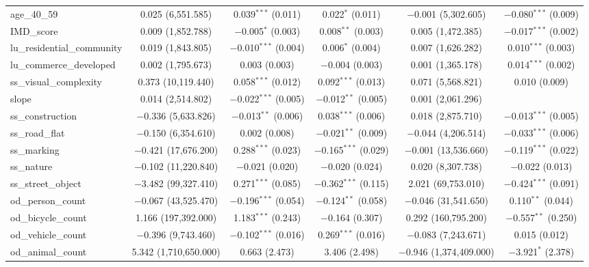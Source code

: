 \begin{table}[!htbp]
\begin{tabular}{@{\extracolsep{1pt}}lccccc}
  age\_40\_59 & 0.025 (6,551.585) & 0.039$^{***}$ (0.011) & 0.022$^{*}$ (0.011) & $-$0.001 (5,302.605) & $-$0.080$^{***}$ (0.009) \\ 
  IMD\_score & 0.009 (1,852.788) & $-$0.005$^{*}$ (0.003) & 0.008$^{**}$ (0.003) & 0.005 (1,472.385) & $-$0.017$^{***}$ (0.002) \\ 
  lu\_residential\_community & 0.019 (1,843.805) & $-$0.010$^{***}$ (0.004) & 0.006$^{*}$ (0.004) & 0.007 (1,626.282) & 0.010$^{***}$ (0.003) \\ 
  lu\_commerce\_developed & 0.002 (1,795.673) & 0.003 (0.003) & $-$0.004 (0.003) & 0.001 (1,365.178) & 0.014$^{***}$ (0.002) \\ 
  ss\_visual\_complexity & 0.373 (10,119.440) & 0.058$^{***}$ (0.012) & 0.092$^{***}$ (0.013) & 0.071 (5,568.821) & 0.010 (0.009) \\ 
  slope & 0.014 (2,514.802) & $-$0.022$^{***}$ (0.005) & $-$0.012$^{**}$ (0.005) & 0.001 (2,061.296) &  \\ 
  ss\_construction & $-$0.336 (5,633.826) & $-$0.013$^{**}$ (0.006) & 0.038$^{***}$ (0.006) & 0.018 (2,875.710) & $-$0.013$^{***}$ (0.005) \\ 
  ss\_road\_flat & $-$0.150 (6,354.610) & 0.002 (0.008) & $-$0.021$^{**}$ (0.009) & $-$0.044 (4,206.514) & $-$0.033$^{***}$ (0.006) \\ 
  ss\_marking & $-$0.421 (17,676.200) & 0.288$^{***}$ (0.023) & $-$0.165$^{***}$ (0.029) & $-$0.001 (13,536.660) & $-$0.119$^{***}$ (0.022) \\ 
  ss\_nature & $-$0.102 (11,220.840) & $-$0.021 (0.020) & $-$0.020 (0.024) & 0.020 (8,307.738) & $-$0.022 (0.013) \\ 
  ss\_street\_object & $-$3.482 (99,327.410) & 0.271$^{***}$ (0.085) & $-$0.362$^{***}$ (0.115) & 2.021 (69,753.010) & $-$0.424$^{***}$ (0.091) \\ 
  od\_person\_count & $-$0.067 (43,525.470) & $-$0.196$^{***}$ (0.054) & $-$0.124$^{**}$ (0.058) & $-$0.046 (31,541.650) & 0.110$^{**}$ (0.044) \\ 
  od\_bicycle\_count & 1.166 (197,392.000) & 1.183$^{***}$ (0.243) & $-$0.164 (0.307) & 0.292 (160,795.200) & $-$0.557$^{**}$ (0.250) \\ 
  od\_vehicle\_count & $-$0.396 (9,743.460) & $-$0.102$^{***}$ (0.016) & 0.269$^{***}$ (0.016) & $-$0.083 (7,243.671) & 0.015 (0.012) \\ 
  od\_animal\_count & 5.342 (1,710,650.000) & 0.663 (2.473) & 3.406 (2.498) & $-$0.946 (1,374,409.000) & $-$3.921$^{*}$ (2.378) \\ 

\end{tabular}
\end{table}
